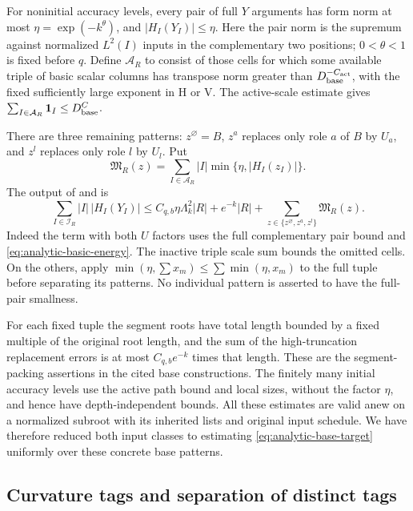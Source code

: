 For noninitial accuracy levels, every pair of full \(Y\) arguments
has form norm at most \(\eta=\exp(-k^\theta)\), and
\(|H_I(Y_I)|\le\eta\).  Here the pair norm is the supremum against
normalized \(L^2(I)\) inputs in the complementary two positions;
\(0<\theta<1\) is fixed before \(q\).  Define \(\mathcal A_R\)
to consist of those cells for which some available triple of basic
scalar columns has transpose norm greater than
\(D_{\rm base}^{-C_{\rm act}}\), with the fixed sufficiently large
exponent in H or V.  The active-scale estimate gives
\(\sum_{I\in\mathcal A_R}\mathbf1_I\le D_{\rm base}^C\).

There are three remaining patterns: \(z^\varnothing=B\),
\(z^a\) replaces only role \(a\) of \(B\) by \(U_a\), and
\(z^l\) replaces only role \(l\) by \(U_l\).  Put
\begin{equation}
 \mathfrak M_R(z)=\sum_{I\in\mathcal A_R}|I|
                         \min\{\eta,|H_I(z_I)|\}.
 \label{eq:analytic-base-target}
\end{equation}
The output of \cite[Proposition~5.8]{H} and
\cite[Proposition~5.6]{V} is
\begin{equation}
 \sum_{I\in\mathcal I_R}|I|\,|H_I(Y_I)|
 \le C_{q,b}\eta\Lambda_k^2|R|+e^{-k}|R|
              +\sum_{z\in\{z^\varnothing,z^a,z^l\}}\mathfrak M_R(z).
 \label{eq:analytic-active-reduction}
\end{equation}
Indeed the term with both \(U\) factors uses the full complementary
pair bound and \eqref{eq:analytic-basic-energy}.  The inactive
triple scale sum bounds the omitted cells.  On the others, apply
\(\min(\eta,\sum x_m)\le\sum\min(\eta,x_m)\) to the full
tuple before separating its patterns.  No individual pattern is
asserted to have the full-pair smallness.

For each fixed tuple the segment roots have total length bounded
by a fixed multiple of the original root length, and the sum of
the high-truncation replacement errors is at most \(C_{q,b}e^{-k}\)
times that length.  These are the segment-packing assertions in
the cited base constructions.  The finitely many initial accuracy
levels use the active path bound and local sizes, without the
factor \(\eta\), and hence have depth-independent bounds.  All
these estimates are valid anew on a normalized subroot with its
inherited lists and original input schedule.  We have therefore
reduced both input classes to estimating
\eqref{eq:analytic-base-target} uniformly over these concrete base
patterns.

\subsection{Curvature tags and separation of distinct tags}

